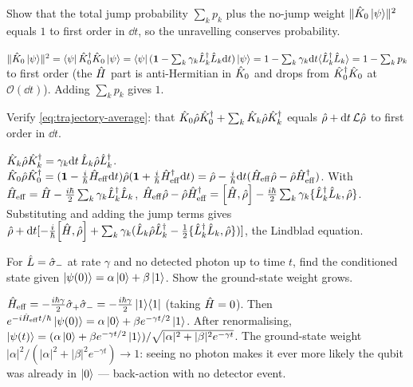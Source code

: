 \begin{exercise}
Show that the total jump probability $\sum_k p_k$ plus the no-jump
weight $\lVert\hat{K}_0\ket\psi\rVert^2$ equals $1$ to first order in
$\dd t$, so the unravelling conserves probability.
\begin{solution}
$\lVert\hat{K}_0\ket\psi\rVert^2=\bra\psi\hat{K}_0^\dagger\hat{K}_0\ket\psi
=\bra\psi(\mathbf{1}-\sum_k\gamma_k\hat{L}_k^\dagger\hat{L}_k\dd t)\ket\psi
=1-\sum_k\gamma_k\dd t\langle\hat{L}_k^\dagger\hat{L}_k\rangle=1-\sum_k p_k$
to first order (the $\hat{H}$ part is anti-Hermitian in $\hat{K}_0$ and
drops from $\hat{K}_0^\dagger\hat{K}_0$ at $\mathcal O(\dd t)$). Adding
$\sum_k p_k$ gives $1$.
\end{solution}
\end{exercise}

\begin{exercise}
Verify \cref{eq:trajectory-average}: that
$\hat{K}_0\hat{\rho}\hat{K}_0^\dagger+\sum_k\hat{K}_k\hat{\rho}\hat{K}_k^\dagger$
equals $\hat{\rho}+\dd t\,\mathcal L\hat{\rho}$ to first order in $\dd t$.
\begin{solution}
$\hat{K}_k\hat{\rho}\hat{K}_k^\dagger=\gamma_k\dd t\,\hat{L}_k\hat{\rho}\hat{L}_k^\dagger$.
$\hat{K}_0\hat{\rho}\hat{K}_0^\dagger
=(\mathbf{1}-\tfrac{i}{\hbar}\hat{H}_{\rm eff}\dd t)\hat{\rho}(\mathbf{1}+\tfrac{i}{\hbar}\hat{H}_{\rm eff}^\dagger\dd t)
=\hat{\rho}-\tfrac{i}{\hbar}\dd t(\hat{H}_{\rm eff}\hat{\rho}-\hat{\rho}\hat{H}_{\rm eff}^\dagger)$.
With $\hat{H}_{\rm eff}=\hat{H}-\tfrac{i\hbar}2\sum_k\gamma_k\hat{L}_k^\dagger\hat{L}_k$,
$\op H_{\rm eff}\op\rho-\op\rho\op H_{\rm eff}^\dagger
=\comm{\op H}{\op\rho}-\tfrac{i\hbar}2\sum_k\gamma_k\{\op L_k^\dagger\op L_k,\op\rho\}$.
Substituting and adding the jump terms gives
$\op\rho+\dd t[-\tfrac{i}{\hbar}\comm{\op H}{\op\rho}+\sum_k\gamma_k(\op L_k\op\rho\op L_k^\dagger-\tfrac12\{\op L_k^\dagger\op L_k,\op\rho\})]$,
the Lindblad equation.
\end{solution}
\end{exercise}

\begin{exercise}
For $\hat{L}=\hat\sigma_-$ at rate $\gamma$ and no detected photon up
to time $t$, find the conditioned state given
$\ket{\psi(0)}=\alpha\ket0+\beta\ket1$. Show the ground-state weight
grows.
\begin{solution}
$\hat{H}_{\rm eff}=-\tfrac{i\hbar\gamma}2\hat\sigma_+\hat\sigma_-
=-\tfrac{i\hbar\gamma}2\ket1\!\bra1$ (taking $\hat{H}=0$). Then
$e^{-i\hat{H}_{\rm eff}t/\hbar}\ket{\psi(0)}=\alpha\ket0+\beta e^{-\gamma t/2}\ket1$.
After renormalising,
$\ket{\psi(t)}=(\alpha\ket0+\beta e^{-\gamma t/2}\ket1)/\sqrt{|\alpha|^2+|\beta|^2e^{-\gamma t}}$.
The ground-state weight $|\alpha|^2/(|\alpha|^2+|\beta|^2e^{-\gamma t})\to1$:
seeing no photon makes it ever more likely the qubit was already in
$\ket0$ --- back-action with no detector event.
\end{solution}
\end{exercise}

